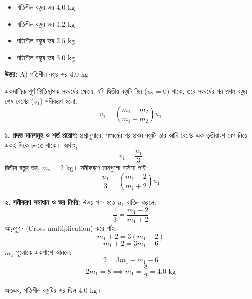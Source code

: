 \documentclass[12pt, a4paper]{article}
\begin{document}
{\begin{center}
\begin{tikzpicture}[>=Stealth, scale=1.3]
\end{tikzpicture}
\end{center}
\vspace{1em}

\begin{itemize}[label={}, leftmargin=1cm, itemsep=0.5em]
\item[\textbf{A)}] গতিশীল বস্তুর ভর $4.0\text{ kg}$
\item[\textbf{B)}] গতিশীল বস্তুর ভর $1.2\text{ kg}$
\item[\textbf{C)}] গতিশীল বস্তুর ভর $2.5\text{ kg}$
\item[\textbf{D)}] গতিশীল বস্তুর ভর $3.0\text{ kg}$
\end{itemize}

\vspace{0.5em}
\begin{tcolorbox}[answerbox]
\textbf{\color{success} উত্তর:} A) গতিশীল বস্তুর ভর $4.0\text{ kg}$
\end{tcolorbox}
\vspace{1em}

\begin{tcolorbox}[solutionbox={সমাধান (Solution)}]
\noindent
একমাত্রিক পূর্ণ স্থিতিস্থাপক সংঘর্ষের ক্ষেত্রে, যদি দ্বিতীয় বস্তুটি স্থির ($u_2 = 0$) থাকে, তবে সংঘর্ষের পর প্রথম বস্তুর শেষ বেগের ($v_1$) সমীকরণ হলো:
$$v_1 = \left(\frac{m_1 - m_2}{m_1 + m_2}\right) u_1$$

\vspace{0.5em}
\textbf{১. প্রদত্ত মানসমূহ ও শর্ত প্রয়োগ:}
প্রশ্নানুসারে, সংঘর্ষের পর প্রথম বস্তুটি তার আদি বেগের এক-তৃতীয়াংশ বেগ নিয়ে একই দিকে চলতে থাকে। অর্থাৎ,
$$v_1 = \frac{u_1}{3}$$
দ্বিতীয় বস্তুর ভর, $m_2 = 2\text{ kg}$।
সমীকরণে মানগুলো বসিয়ে পাই:
$$\frac{u_1}{3} = \left(\frac{m_1 - 2}{m_1 + 2}\right) u_1$$

\vspace{0.5em}
\textbf{২. সমীকরণ সমাধান ও ভর নির্ণয়:}
উভয় পক্ষ হতে $u_1$ বাতিল করলে:
$$\frac{1}{3} = \frac{m_1 - 2}{m_1 + 2}$$
আড়গুণন (Cross-multiplication) করে পাই:
$$m_1 + 2 = 3(m_1 - 2)$$
$$m_1 + 2 = 3m_1 - 6$$
$m_1$ গুলোকে একপাশে আনলে:
$$2 = 3m_1 - m_1 - 6$$
$$2m_1 = 8 \implies m_1 = \frac{8}{2} = 4.0\text{ kg}$$

অতএব, গতিশীল বস্তুটির ভর ছিল $4.0\text{ kg}$।
\end{tcolorbox}
\vspace{2em}


}
\end{document}
